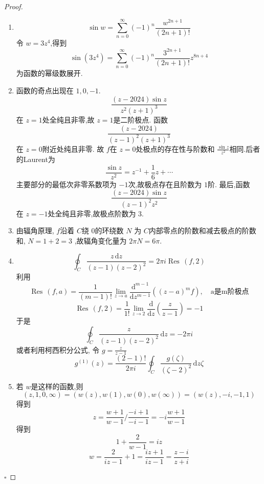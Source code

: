 \documentclass[../../复变函数.tex]{subfiles}
\begin{document}
\begin{proof}
    \begin{enumerate}
        \item \[
        \sin w= \sum _{n = 0}^{\infty}\left( -1 \right)^{n} \frac{w^{2n+ 1} }{\left( 2n+ 1 \right)!  } 
        \]令 \(  w= 3z^{4}  \),得到 \[
        \sin \left( 3z^{4} \right)= \sum _{n = 0}^{\infty}\left( -1 \right)^{n} \frac{3^{2n+ 1} }{\left( 2n+ 1 \right)!  }    z^{8n+ 4}
        \]为函数的幂级数展开. 
        \item 函数的奇点出现在 \(  1,0,-1  \).  \[
        \frac{\left( z-2024 \right)\sin z  }{z^{2}\left( z+ 1 \right)^{3}  } 
        \]在 \(  z= 1  \)处全纯且非零,故 \(  z= 1  \)是二阶极点.  函数 \[
        \frac{\left( z-2024 \right)  }{\left( z-1 \right)^{2}\left( z+ 1 \right)^{3}   } 
        \]在 \(  z= 0  \)附近处纯且非零. 故 \(  f  \)在 \(  z= 0  \)处极点的存在性与阶数和 \(  \frac{\sin z }{z^{2} }   \)相同.后者的Laurent为 \[
        \frac{\sin z }{z^{2} }= z^{-1}+ \frac{1 }{6 }z+ \cdots   
        \]   主要部分的最低次非零系数项为 \(  -1  \)次,故极点存在且阶数为 \(  1  \)阶.  
         最后,函数 \[
         \frac{\left( z-2024 \right)  \sin z}{\left( z-1 \right)^{2}z^{2}  } 
         \]在 \(  z= -1  \)处全纯且非零,故极点阶数为 \(  3  \).  
         \item 由辐角原理, \(  f  \)沿着 \(  C  \)绕 \(  0  \)的环绕数 \(  N  \) 为 \(  C  \)内部零点的阶数和减去极点的阶数和, \(  N= 1+ 2= 3  \) ,故辐角变化量为 \(  2\pi  N= 6\pi   \).
         \item  \[
         \oint_{C}\frac{z\,\mathrm{d} z }{\left( z-1 \right)  \left( z-2 \right)^{2} }= 2\pi i\operatorname{Res}\,\left( f,2 \right)  
         \]     利用 \[
         \operatorname{Res}\,\left( f,a \right)= \frac{1 }{\left( m-1 \right)!  }  \lim_{z\to a}\frac{\mathrm{d}^{m-1}}{\mathrm{d}z^{m-1}}\left( \left( z-a \right)^{m}f  \right) ,\quad \text{a是m阶极点}
         \] \[
         \operatorname{Res}\,\left( f,2 \right)= \frac{1 }{1 !}\lim_{z\to 2}\frac{\mathrm{d}}{\mathrm{d}z}\left( \frac{z }{z-1 }  \right)   = -1
         \]于是 \[
         \oint_{C}\frac{z }{\left( z-1 \right)\left( z-2 \right)^{2}   } \,\mathrm{d} z= -2\pi i
         \]或者利用柯西积分公式, 令 \(  g = \frac{z }{z-1 }   \)  \[
         g^{\left( 1\right) }\left( z \right) =\frac{\left( 2-1 \right)!  }{2\pi i } \oint_{C}\frac{g\left( \zeta  \right)  }{\left( \zeta -2 \right)^{2}  }\,\mathrm{d} z\zeta  
         \]
         \item 若 \(  w  \)是这样的函数,则 \[
      \left( z,1,0,\infty \right)= \left( w\left( z \right),w\left( 1 \right),w\left( 0 \right),w\left( \infty \right)     \right)  = \left( w\left( z \right), -i,-1,1 \right) 
         \]得到 \[
         z= \frac{w+ 1 }{w-1 }/ \frac{-i+ 1 }{-i-1 }= -i\frac{w+ 1 }{w-1 }    
         \] 得到 \[
         1+ \frac{2 }{w-1 }= iz 
         \] \[
         w= \frac{2 }{iz-1 }+ 1= \frac{iz+ 1 }{iz-1 }= \frac{z-i }{z+ i }   
         \]
    \end{enumerate}
    

    \hfill $\square$
\end{proof}
\end{document}
